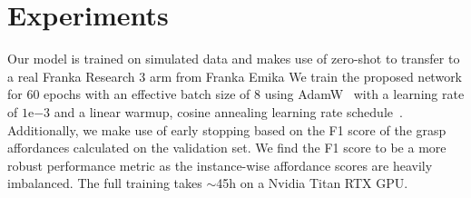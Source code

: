 \documentclass[letterpaper, 10 pt, conference]{ieeeconf}  %
\begin{document}
 
\vspace{-1mm}
\section{Experiments}
\label{sec:experiments}






Our model is trained on simulated data and makes use of zero-shot to transfer to a real Franka Research 3 arm from Franka Emika
We train the proposed network for 60 epochs with an effective batch size of 8 using AdamW~\cite{loshchilov2017decoupled} with a learning rate of $1\mathrm{e}{-3}$ and a linear warmup, cosine annealing learning rate schedule~\cite{loshchilov2016sgdr}. Additionally, we make use of early stopping based on the F1 score of the grasp affordances calculated on the validation set. We find the F1 score to be a more robust performance metric as the instance-wise affordance scores are heavily imbalanced. The full training takes $\sim$45h on a Nvidia Titan RTX GPU.
\end{document}
